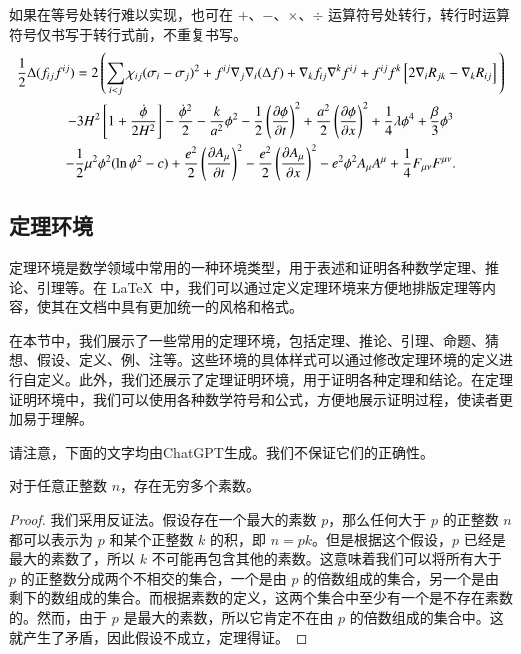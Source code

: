 如果在等号处转行难以实现，也可在 $+$、$-$、$\times$、$\div$ 运算符号处转行，转行时运算符号仅书写于转行式前，不重复书写。
\begin{multline}
  \frac{1}{2} \Delta (f_{ij} f^{ij}) =
  2 \left(\sum_{i<j} \chi_{ij}(\sigma_{i} - \sigma_{j})^{2}
  + f^{ij} \nabla_{j} \nabla_{i} (\Delta f)  + \nabla_{k} f_{ij} \nabla^{k} f^{ij} +
  f^{ij} f^{k} \left[2\nabla_{i}R_{jk}- \nabla_{k} R_{ij} \right] \vphantom{\sum_{i<j}} \right) \\
  - 3H^{2}\left[1+\frac{\dot{\phi}}{2H^2}\right] - \frac{\dot{\phi}^{2}}{2} - \frac{k}{a^{2}}\phi^{2} - \frac{1}{2}\left(\frac{\partial\phi}{\partial t}\right)^{2} + \frac{a^2}{2}\left(\frac{\partial\phi}{\partial x}\right)^{2}
  + \frac{1}{4}\lambda\phi^{4} + \frac{\beta}{3}\phi^{3} \\
  -\frac{1}{2}\mu^{2}\phi^{2}(\ln{\phi^{2}} - c) 
  + \frac{e^{2}}{2}\left(\frac{\partial A_{\mu}}{\partial t}\right)^{2} - \frac{e^{2}}{2}\left(\frac{\partial A_{\mu}}{\partial x}\right)^{2}
  - e^{2}\phi^{2}A_{\mu}A^{\mu} + \frac{1}{4}F_{\mu\nu}F^{\mu\nu}.
\end{multline}

\subsection{定理环境}

定理环境是数学领域中常用的一种环境类型，用于表述和证明各种数学定理、推论、引理等。在 \LaTeX\ 中，我们可以通过定义定理环境来方便地排版定理等内容，使其在文档中具有更加统一的风格和格式。

在本节中，我们展示了一些常用的定理环境，包括定理、推论、引理、命题、猜想、假设、定义、例、注等。这些环境的具体样式可以通过修改定理环境的定义进行自定义。此外，我们还展示了定理证明环境，用于证明各种定理和结论。在定理证明环境中，我们可以使用各种数学符号和公式，方便地展示证明过程，使读者更加易于理解。

请注意，下面的文字均由ChatGPT生成。我们不保证它们的正确性。

\begin{thm}
  对于任意正整数 $n$，存在无穷多个素数。
\end{thm}

\begin{proof}
  我们采用反证法。假设存在一个最大的素数 $p$，那么任何大于 $p$ 的正整数 $n$ 都可以表示为 $p$ 和某个正整数 $k$ 的积，即 $n = pk$。但是根据这个假设，$p$ 已经是最大的素数了，所以 $k$ 不可能再包含其他的素数。这意味着我们可以将所有大于 $p$ 的正整数分成两个不相交的集合，一个是由 $p$ 的倍数组成的集合，另一个是由剩下的数组成的集合。而根据素数的定义，这两个集合中至少有一个是不存在素数的。然而，由于 $p$ 是最大的素数，所以它肯定不在由 $p$ 的倍数组成的集合中。这就产生了矛盾，因此假设不成立，定理得证。
\end{proof}

